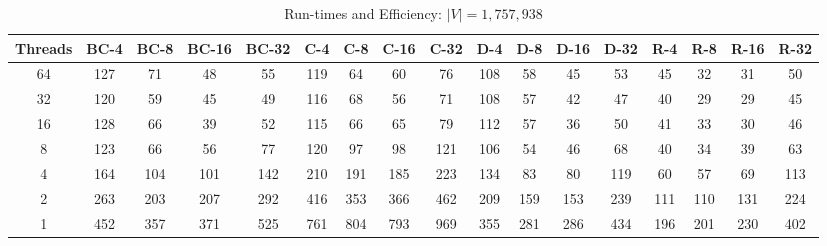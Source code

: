 \begin{table}[t]
\begin{minipage}[b]{\textwidth}
\label{tab:graph2}
\caption{Run-times and Efficiency: $\left \vert V \right \vert = 1,757,938$}
{\small
\begin{tabular}{||c||c|c|c|c||c|c|c|c||c|c|c|c||c|c|c|c|}
\hline
\textbf{Threads}	&\cellcolor{black!10}BC-4&	\cellcolor{black!10}BC-8	&\cellcolor{black!10}BC-16	&\cellcolor{black!10}BC-32&	\cellcolor{black!10}C-4	&\cellcolor{black!10}C-8&	\cellcolor{black!10}C-16&	\cellcolor{black!10}C-32&	\cellcolor{black!10}D-4&	\cellcolor{black!10}D-8	&\cellcolor{black!10}D-16&\cellcolor{black!10}	D-32&	\cellcolor{black!10}R-4	&\cellcolor{black!10}R-8&	\cellcolor{black!10}R-16&	\cellcolor{black!10}R-32 \\ \hline \hline
64		&127	&71	&48	&55	&119	&64	&60	&76	&108	&58	&45	&53	&45	&32	&31	&50		 \\ \hline		
32		&120	&59	&45	&49	&116	&68	&56	&71	&108	&57	&42	&47	&40	&29	&29	&45		 \\ \hline			
16		&128	&66	&39	&52	&115	&66	&65	&79	&112	&57	&36	&50	&41	&33	&30	&46 \\ \hline				
8		&123	&66	&56	&77	&120	&97	&98	&121	&106	&54	&46	&68	&40	&34	&39	&63	 \\ \hline			
4		&164	&104	&101	&142	&210	&191	&185	&223	&134	&83	&80	&119	&60	&57	&69	&113	 \\ \hline			
2		&263	&203	&207	&292	&416	&353	&366	&462	&209	&159	&153	&239	&111	&110	&131	&224	 \\ \hline		
1		&452&357	&371	&525	&761	&804	&793	&969	&355	&281	&286	&434	&196	&201	&230	&402 \\ \hline		
\end{tabular}
}
\end{minipage}
\end{table}


